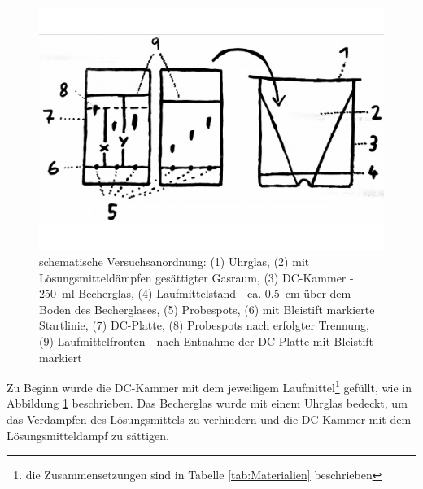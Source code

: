 \documentclass{article}
\begin{document}
        \begin{figure}[H]
          \includegraphics[scale=0.13, center]{Graphiken/Versuchsanordnungen/VersuchsanordnungDC.png} 
          \caption[schematische Versuchsanordnung Dünnschichtchromatographie, Quelle: Autor]{schematische Versuchsanordnung: (1) Uhrglas, (2) mit Lösungsmitteldämpfen gesättigter Gasraum, (3) DC-Kammer - \SI[mode=text,separate-uncertainty=true]{250}{\milli\litre} Becherglas, (4) Laufmittelstand - ca. \SI[mode=text]{0.5}{\centi\meter} über dem Boden des Becherglases, (5) Probespots, (6) mit Bleistift markierte Startlinie, (7) DC-Platte, (8) Probespots nach erfolgter Trennung, (9) Laufmittelfronten - nach Entnahme der DC-Platte mit Bleistift markiert}
          \label{fig:Versuchsanordnung}
        \end{figure}
    
        Zu Beginn wurde die DC-Kammer mit dem jeweiligem Laufmittel\footnote{die Zusammensetzungen sind in Tabelle \ref{tab:Materialien} beschrieben} gefüllt, wie in Abbildung \ref{fig:Versuchsanordnung} beschrieben. Das Becherglas wurde mit einem Uhrglas bedeckt, um das Verdampfen des Lösungsmittels zu verhindern und die DC-Kammer mit dem Lösungsmitteldampf zu sättigen. 
        
\end{document}
